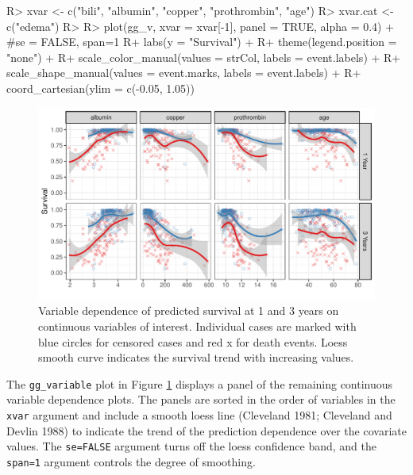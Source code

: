 \documentclass[article]{jss}
\begin{document}
\begin{Schunk}
\begin{Sinput}
R> xvar <- c("bili", "albumin", "copper", "prothrombin", "age")
R> xvar.cat <- c("edema")
R> 
R> plot(gg_v, xvar = xvar[-1], panel = TRUE, alpha = 0.4) + #se = FALSE, span=1
R+   labs(y = "Survival") +
R+   theme(legend.position = "none") +
R+   scale_color_manual(values = strCol, labels = event.labels) +
R+   scale_shape_manual(values = event.marks, labels = event.labels) +
R+   coord_cartesian(ylim = c(-0.05, 1.05))
\end{Sinput}
\begin{figure}[!htb]

{\centering \includegraphics{fig-rfs/rfs-variable-plot-1} 

}

\caption[Variable dependence of predicted survival at 1 and 3 years on continuous variables of interest]{Variable dependence of predicted survival at 1 and 3 years on continuous variables of interest. Individual cases are marked with blue circles for censored cases and red x for death events. Loess smooth curve indicates the survival trend with increasing values.}\label{fig:variable-plot}
\end{figure}
\end{Schunk}

The \texttt{gg\_variable} plot in Figure \ref{fig:variable-plot}
displays a panel of the remaining continuous variable dependence plots.
The panels are sorted in the order of variables in the \texttt{xvar}
argument and include a smooth loess line (Cleveland 1981; Cleveland and
Devlin 1988) to indicate the trend of the prediction dependence over the
covariate values. The \texttt{se=FALSE} argument turns off the loess
confidence band, and the \texttt{span=1} argument controls the degree of
smoothing.
\end{document}
